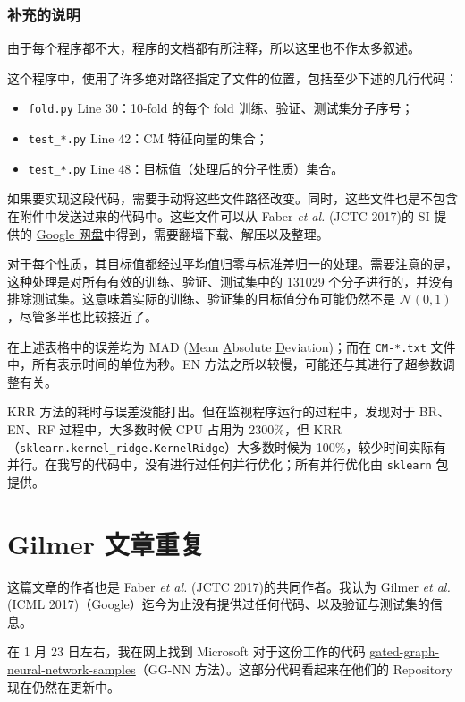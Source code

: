 \documentclass[10pt,a4paper,onecolumn]{article}
\numberwithin{equation}{section}
\begin{document}
\subsubsection{补充的说明}

由于每个程序都不大，程序的文档都有所注释，所以这里也不作太多叙述。

这个程序中，使用了许多绝对路径指定了文件的位置，包括至少下述的几行代码：
\begin{itemize}[noitemsep]
  \item \verb|fold.py| Line 30：10-fold 的每个 fold 训练、验证、测试集分子序号；
  \item \verb|test_*.py| Line 42：CM 特征向量的集合；
  \item \verb|test_*.py| Line 48：目标值（处理后的分子性质）集合。
\end{itemize}
如果要实现这段代码，需要手动将这些文件路径改变。同时，这些文件也是不包含在附件中发送过来的代码中。这些文件可以从 Faber \emph{et al.} (JCTC 2017)\citep{Faber-Lilienfeld.JCTC.2017.13}的 SI 提供的 \href{https://drive.google.com/open?
  id=0Bzn36Iqm8hZscHFJcVh5aC1mZFU}{Google 网盘}中得到，需要翻墙下载、解压以及整理。

对于每个性质，其目标值都经过平均值归零与标准差归一的处理。需要注意的是，这种处理是对所有有效的训练、验证、测试集中的 131029 个分子进行的，并没有排除测试集。这意味着实际的训练、验证集的目标值分布可能仍然不是 $ \mathcal{N}(0,1) $，尽管多半也比较接近了。

在上述表格中的误差均为 MAD (\underline Mean \underline Absolute \underline Deviation)；而在 \verb|CM-*.txt| 文件中，所有表示时间的单位为秒。EN 方法之所以较慢，可能还与其进行了超参数调整有关。

KRR 方法的耗时与误差没能打出。但在监视程序运行的过程中，发现对于 BR、EN、RF 过程中，大多数时候 CPU 占用为 2300\%，但 KRR（\verb|sklearn.kernel_ridge.KernelRidge|）大多数时候为 100\%，较少时间实际有并行。在我写的代码中，没有进行过任何并行优化；所有并行优化由 \verb|sklearn| 包提供。

\section{Gilmer 文章重复}

这篇文章的作者也是 Faber \emph{et al.} (JCTC 2017)\citep{Faber-Lilienfeld.JCTC.2017.13}的共同作者。我认为 Gilmer \emph{et al.} (ICML 2017)\citep{Gilmer-Dahl.ICoML.2017.70}（Google）迄今为止没有提供过任何代码、以及验证与测试集的信息。

在 1 月 23 日左右，我在网上找到 Microsoft 对于这份工作的代码 \href{https://github.com/Microsoft/gated-graph-neural-network-samples}{gated-graph-neural-network-samples}（GG-NN 方法）。这部分代码看起来在他们的 Repository 现在仍然在更新中。
\end{document}
